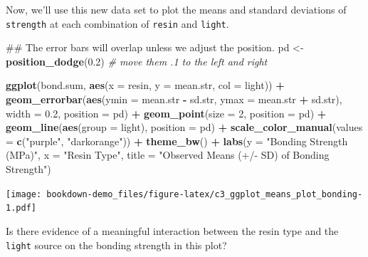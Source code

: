 \documentclass[]{book}
\newenvironment{Shaded}{\begin{snugshade}}{\end{snugshade}}
\newcommand{\KeywordTok}[1]{\textcolor[rgb]{0.13,0.29,0.53}{\textbf{#1}}}
\newcommand{\DataTypeTok}[1]{\textcolor[rgb]{0.13,0.29,0.53}{#1}}
\newcommand{\DecValTok}[1]{\textcolor[rgb]{0.00,0.00,0.81}{#1}}
\newcommand{\FloatTok}[1]{\textcolor[rgb]{0.00,0.00,0.81}{#1}}
\newcommand{\StringTok}[1]{\textcolor[rgb]{0.31,0.60,0.02}{#1}}
\newcommand{\CommentTok}[1]{\textcolor[rgb]{0.56,0.35,0.01}{\textit{#1}}}
\newcommand{\OperatorTok}[1]{\textcolor[rgb]{0.81,0.36,0.00}{\textbf{#1}}}
\newcommand{\NormalTok}[1]{#1}
\theoremstyle{definition}
\theoremstyle{definition}
\theoremstyle{definition}
\theoremstyle{remark}
\begin{document}
Now, we'll use this new data set to plot the means and standard
deviations of \texttt{strength} at each combination of \texttt{resin}
and \texttt{light}.

\begin{Shaded}
\begin{Highlighting}[]
\NormalTok{## The error bars will overlap unless we adjust the position.}
\NormalTok{pd <-}\StringTok{ }\KeywordTok{position_dodge}\NormalTok{(}\FloatTok{0.2}\NormalTok{) }\CommentTok{# move them .1 to the left and right}

\KeywordTok{ggplot}\NormalTok{(bond.sum, }\KeywordTok{aes}\NormalTok{(}\DataTypeTok{x =}\NormalTok{ resin, }\DataTypeTok{y =}\NormalTok{ mean.str, }\DataTypeTok{col =}\NormalTok{ light)) }\OperatorTok{+}
\StringTok{    }\KeywordTok{geom_errorbar}\NormalTok{(}\KeywordTok{aes}\NormalTok{(}\DataTypeTok{ymin =}\NormalTok{ mean.str }\OperatorTok{-}\StringTok{ }\NormalTok{sd.str, }
                      \DataTypeTok{ymax =}\NormalTok{ mean.str }\OperatorTok{+}\StringTok{ }\NormalTok{sd.str),}
                  \DataTypeTok{width =} \FloatTok{0.2}\NormalTok{, }\DataTypeTok{position =}\NormalTok{ pd) }\OperatorTok{+}
\StringTok{    }\KeywordTok{geom_point}\NormalTok{(}\DataTypeTok{size =} \DecValTok{2}\NormalTok{, }\DataTypeTok{position =}\NormalTok{ pd) }\OperatorTok{+}\StringTok{ }
\StringTok{    }\KeywordTok{geom_line}\NormalTok{(}\KeywordTok{aes}\NormalTok{(}\DataTypeTok{group =}\NormalTok{ light), }\DataTypeTok{position =}\NormalTok{ pd) }\OperatorTok{+}
\StringTok{    }\KeywordTok{scale_color_manual}\NormalTok{(}\DataTypeTok{values =} \KeywordTok{c}\NormalTok{(}\StringTok{"purple"}\NormalTok{, }\StringTok{"darkorange"}\NormalTok{)) }\OperatorTok{+}
\StringTok{    }\KeywordTok{theme_bw}\NormalTok{() }\OperatorTok{+}
\StringTok{    }\KeywordTok{labs}\NormalTok{(}\DataTypeTok{y =} \StringTok{"Bonding Strength (MPa)"}\NormalTok{, }\DataTypeTok{x =} \StringTok{"Resin Type"}\NormalTok{,}
         \DataTypeTok{title =} \StringTok{"Observed Means (+/- SD) of Bonding Strength"}\NormalTok{)}
\end{Highlighting}
\end{Shaded}

\texttt{[image: bookdown-demo\_files/figure-latex/c3\_ggplot\_means\_plot\_bonding-1.pdf]}

Is there evidence of a meaningful interaction between the resin type and
the \texttt{light} source on the bonding strength in this plot?
\end{document}
